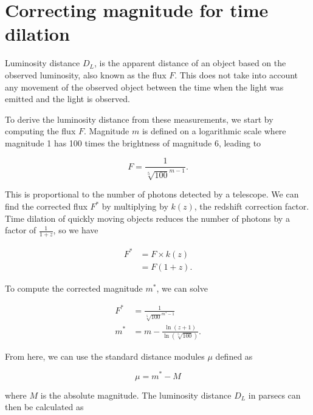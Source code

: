 \documentclass{article}
\begin{document}
\section{Correcting magnitude for time dilation}
\label{sec:correction}

Luminosity distance $D_L$, is the apparent distance of an object based on the
observed luminosity, also known as the flux $F$. This does not take into
account any movement of the observed object between the time when the light was
emitted and the light is observed.

To derive the luminosity distance from these measurements, we start
by computing the flux $F$. Magnitude $m$ is defined on a logarithmic scale
where magnitude 1 has 100 times the brightness of magnitude 6, leading to

\begin{equation}
  F = \frac{1}{\sqrt[5]{100}^{m - 1}}.
\end{equation}

This is proportional to the number of photons detected by a telescope. We can
find the corrected flux $F^*$ by multiplying by $k(z)$, the redshift correction
factor. Time dilation of quickly moving objects reduces the number of photons
by a factor of $\frac{1}{1 + z}$, so we have

\begin{equation}
\begin{aligned}
  F^* &= F \times k(z) \\
      &= F (1 + z).
\end{aligned}
\end{equation}

To compute the corrected magnitude $m^*$, we can solve

\begin{equation}
\begin{aligned}
   F^* &= \frac{1}{\sqrt[5]{100}^{m^* - 1}} \\
   m^* &= m - \frac{\ln{(z + 1)}}{\ln{(\sqrt[5]{100})}}.
\end{aligned}
\end{equation}

From here, we can use the standard distance modules $\mu$ defined as

\begin{equation}
  \mu = m^* - M
\end{equation}

where $M$ is the absolute magnitude. The luminosity distance $D_L$ in parsecs
can then be calculated as
\end{document}
